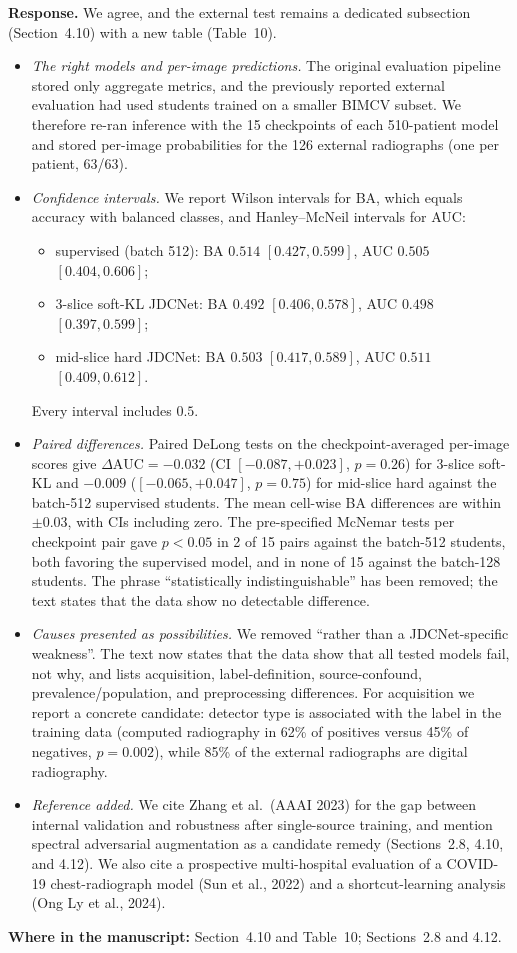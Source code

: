 \documentclass[11pt]{article}
\newcommand{\where}[1]{\par\noindent\textbf{Where in the manuscript:} #1\par}
\begin{document}
\textbf{Response.} We agree, and the external test remains a dedicated
subsection (Section~4.10) with a new table (Table~10).
\begin{itemize}[leftmargin=1.4em]
  \item \emph{The right models and per-image predictions.} The original evaluation pipeline stored only aggregate metrics, and the previously reported external evaluation had used students trained on a smaller BIMCV subset. We therefore re-ran inference with the 15 checkpoints of each 510-patient model and stored per-image probabilities for the 126 external radiographs (one per patient, 63/63).
  \item \emph{Confidence intervals.} We report Wilson intervals for BA, which equals accuracy with balanced classes, and Hanley--McNeil intervals for AUC:
  \begin{itemize}[leftmargin=1.2em]
    \item supervised (batch 512): BA $0.514$ $[0.427,0.599]$, AUC $0.505$ $[0.404,0.606]$;
    \item 3-slice soft-KL JDCNet: BA $0.492$ $[0.406,0.578]$, AUC $0.498$ $[0.397,0.599]$;
    \item mid-slice hard JDCNet: BA $0.503$ $[0.417,0.589]$, AUC $0.511$ $[0.409,0.612]$.
  \end{itemize}
  Every interval includes $0.5$.
  \item \emph{Paired differences.} Paired DeLong tests on the checkpoint-averaged per-image scores give $\Delta\mathrm{AUC}=-0.032$ (CI $[-0.087,+0.023]$, $p=0.26$) for 3-slice soft-KL and $-0.009$ ($[-0.065,+0.047]$, $p=0.75$) for mid-slice hard against the batch-512 supervised students. The mean cell-wise BA differences are within $\pm0.03$, with CIs including zero. The pre-specified McNemar tests per checkpoint pair gave $p<0.05$ in 2 of 15 pairs against the batch-512 students, both favoring the supervised model, and in none of 15 against the batch-128 students. The phrase ``statistically indistinguishable'' has been removed; the text states that the data show no detectable difference.
  \item \emph{Causes presented as possibilities.} We removed ``rather than a JDCNet-specific weakness''. The text now states that the data show that all tested models fail, not why, and lists acquisition, label-definition, source-confound, prevalence/population, and preprocessing differences. For acquisition we report a concrete candidate: detector type is associated with the label in the training data (computed radiography in 62\% of positives versus 45\% of negatives, $p=0.002$), while 85\% of the external radiographs are digital radiography.
  \item \emph{Reference added.} We cite Zhang et al.\ (AAAI 2023) for the gap between internal validation and robustness after single-source training, and mention spectral adversarial augmentation as a candidate remedy (Sections~2.8, 4.10, and 4.12). We also cite a prospective multi-hospital evaluation of a COVID-19 chest-radiograph model (Sun et al., 2022) and a shortcut-learning analysis (Ong Ly et al., 2024).
\end{itemize}
\where{Section~4.10 and Table~10; Sections~2.8 and 4.12.}
\end{document}
